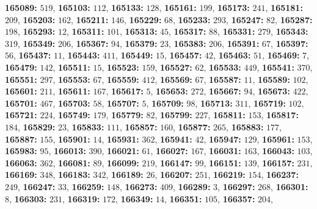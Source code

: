 \textsf{\bfseries 165089:} $519$, \textsf{\bfseries 165103:} $112$, \textsf{\bfseries 165133:} $128$, \textsf{\bfseries 165161:} $199$, \textsf{\bfseries 165173:} $241$, \textsf{\bfseries 165181:} $209$, \textsf{\bfseries 165203:} $162$, \textsf{\bfseries 165211:} $146$, \textsf{\bfseries 165229:} $68$, \textsf{\bfseries 165233:} $293$, \textsf{\bfseries 165247:} $82$, \textsf{\bfseries 165287:} $198$, \textsf{\bfseries 165293:} $12$, \textsf{\bfseries 165311:} $101$, \textsf{\bfseries 165313:} $45$, \textsf{\bfseries 165317:} $88$, \textsf{\bfseries 165331:} $279$, \textsf{\bfseries 165343:} $319$, \textsf{\bfseries 165349:} $206$, \textsf{\bfseries 165367:} $94$, \textsf{\bfseries 165379:} $23$, \textsf{\bfseries 165383:} $206$, \textsf{\bfseries 165391:} $67$, \textsf{\bfseries 165397:} $56$, \textsf{\bfseries 165437:} $11$, \textsf{\bfseries 165443:} $411$, \textsf{\bfseries 165449:} $15$, \textsf{\bfseries 165457:} $42$, \textsf{\bfseries 165463:} $51$, \textsf{\bfseries 165469:} $7$, \textsf{\bfseries 165479:} $142$, \textsf{\bfseries 165511:} $15$, \textsf{\bfseries 165523:} $159$, \textsf{\bfseries 165527:} $62$, \textsf{\bfseries 165533:} $449$, \textsf{\bfseries 165541:} $370$, \textsf{\bfseries 165551:} $297$, \textsf{\bfseries 165553:} $67$, \textsf{\bfseries 165559:} $412$, \textsf{\bfseries 165569:} $67$, \textsf{\bfseries 165587:} $11$, \textsf{\bfseries 165589:} $102$, \textsf{\bfseries 165601:} $211$, \textsf{\bfseries 165611:} $167$, \textsf{\bfseries 165617:} $5$, \textsf{\bfseries 165653:} $272$, \textsf{\bfseries 165667:} $94$, \textsf{\bfseries 165673:} $422$, \textsf{\bfseries 165701:} $467$, \textsf{\bfseries 165703:} $58$, \textsf{\bfseries 165707:} $5$, \textsf{\bfseries 165709:} $98$, \textsf{\bfseries 165713:} $311$, \textsf{\bfseries 165719:} $102$, \textsf{\bfseries 165721:} $224$, \textsf{\bfseries 165749:} $179$, \textsf{\bfseries 165779:} $82$, \textsf{\bfseries 165799:} $227$, \textsf{\bfseries 165811:} $153$, \textsf{\bfseries 165817:} $184$, \textsf{\bfseries 165829:} $23$, \textsf{\bfseries 165833:} $111$, \textsf{\bfseries 165857:} $160$, \textsf{\bfseries 165877:} $265$, \textsf{\bfseries 165883:} $177$, \textsf{\bfseries 165887:} $155$, \textsf{\bfseries 165901:} $14$, \textsf{\bfseries 165931:} $362$, \textsf{\bfseries 165941:} $42$, \textsf{\bfseries 165947:} $129$, \textsf{\bfseries 165961:} $153$, \textsf{\bfseries 165983:} $95$, \textsf{\bfseries 166013:} $390$, \textsf{\bfseries 166021:} $61$, \textsf{\bfseries 166027:} $167$, \textsf{\bfseries 166031:} $163$, \textsf{\bfseries 166043:} $103$, \textsf{\bfseries 166063:} $362$, \textsf{\bfseries 166081:} $89$, \textsf{\bfseries 166099:} $219$, \textsf{\bfseries 166147:} $99$, \textsf{\bfseries 166151:} $139$, \textsf{\bfseries 166157:} $231$, \textsf{\bfseries 166169:} $348$, \textsf{\bfseries 166183:} $342$, \textsf{\bfseries 166189:} $26$, \textsf{\bfseries 166207:} $251$, \textsf{\bfseries 166219:} $154$, \textsf{\bfseries 166237:} $249$, \textsf{\bfseries 166247:} $33$, \textsf{\bfseries 166259:} $148$, \textsf{\bfseries 166273:} $409$, \textsf{\bfseries 166289:} $3$, \textsf{\bfseries 166297:} $268$, \textsf{\bfseries 166301:} $8$, \textsf{\bfseries 166303:} $231$, \textsf{\bfseries 166319:} $172$, \textsf{\bfseries 166349:} $14$, \textsf{\bfseries 166351:} $105$, \textsf{\bfseries 166357:} $204$, 
